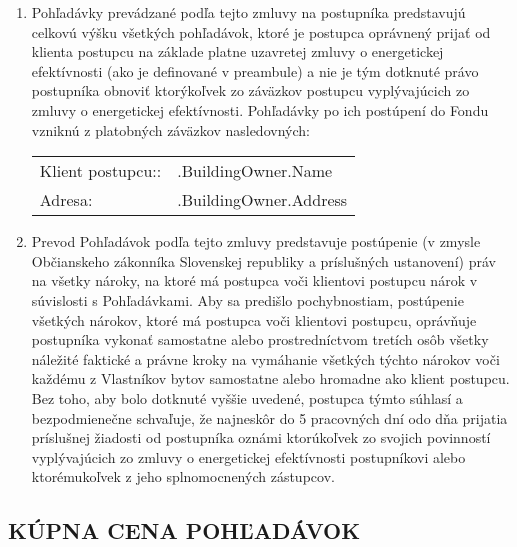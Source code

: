 \documentclass[a4paper]{article}
\begin{document}
\begin{enumerate}
\item{Pohľadávky prevádzané podľa tejto zmluvy na postupníka predstavujú celkovú výšku všetkých pohľadávok, ktoré je postupca oprávnený prijať od klienta postupcu na základe platne uzavretej zmluvy o energetickej efektívnosti (ako je definované v preambule) a nie je tým dotknuté právo postupníka obnoviť ktorýkoľvek zo záväzkov postupcu vyplývajúcich zo zmluvy o energetickej efektívnosti. Pohľadávky po ich postúpení do Fondu vzniknú z platobných záväzkov nasledovných:} \par

    \begin{tabu}{XX[2]}
    Klient postupcu::  & {{.BuildingOwner.Name}} \\
      Adresa:      & {{.BuildingOwner.Address}}
    \end{tabu}

\item{Prevod Pohľadávok podľa tejto zmluvy predstavuje postúpenie (v zmysle Občianskeho zákonníka Slovenskej republiky a príslušných ustanovení) práv na všetky nároky, na ktoré má postupca voči klientovi postupcu nárok v súvislosti s Pohľadávkami. Aby sa predišlo pochybnostiam, postúpenie všetkých nárokov, ktoré má postupca voči klientovi postupcu, oprávňuje postupníka vykonať samostatne alebo prostredníctvom tretích osôb všetky náležité faktické a právne kroky na vymáhanie všetkých týchto nárokov voči každému z Vlastníkov bytov samostatne alebo hromadne ako klient postupcu. Bez toho, aby bolo dotknuté vyššie uvedené, postupca týmto súhlasí a bezpodmienečne schvaľuje, že najneskôr do 5 pracovných dní odo dňa prijatia príslušnej žiadosti od postupníka oznámi ktorúkoľvek zo svojich povinností vyplývajúcich zo zmluvy o energetickej efektívnosti postupníkovi alebo ktorémukoľvek z jeho splnomocnených zástupcov.  }
\end{enumerate}

\subsection{KÚPNA CENA POHĽADÁVOK}
\end{document}
